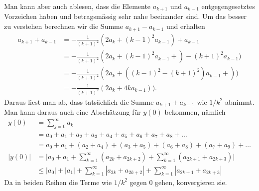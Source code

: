 \begin{loesung}
Man kann aber auch ablesen, dass die Elemente $a_{k+1}$ und $a_{k-1}$ 
entgegengesetztes Vorzeichen haben und betragsmässig sehr nahe beeinander
sind.
Um das besser zu verstehen berechnen wir die Summe $a_{k+1}-a_{k-1}$
und erhalten
\begin{align*}
a_{k+1}+a_{k-1}
&=
-\frac{1}{(k+1)^2}(2a_k + (k-1)^2 a_{k-1}) + a_{k-1}
\\
&=
-\frac{1}{(k+1)^2}(2a_k + (k-1)^2 a_{k-1}+) - (k+1)^2a_{k-1})
\\
&=
-\frac{1}{(k+1)^2}(2a_k + ((k-1)^2-(k+1)^2) a_{k-1}+))
\\
&=
-\frac{1}{(k+1)^2}(2a_k + 4ka_{k-1})).
\end{align*}
Daraus liest man ab, dass tatsächlich die Summe $a_{k+1}+a_{k-1}$
wie $1/k^2$ abnimmt.
Man kann daraus auch eine Abschätzung für $y(0)$ bekommen, nämlich
\begin{align*}
y(0)
&=
\sum_{j=0}^\infty a_k 
\\
&=
a_0 + a_1 + a_2 + a_3 + a_4+ a_5 + a_6 + a_7 + a_8 + \dots
\\
&=
a_0 + a_1 + (a_2 + a_4) + (a_3 + a_5) + (a_6 + a_8) + (a_7 + a_9)+\dots
\\
|y(0)|
&=
\biggl|
a_0 + a_1
+
\sum_{k=1}^\infty (a_{2k} + a_{2k+2})
+
\sum_{k=1}^\infty (a_{2k+1} + a_{2k+3})
\biggr|
\\
&\le
|a_0| + |a_1|
+
\sum_{k=1}^\infty |a_{2k}+a_{2k+2}|
+
\sum_{k=1}^\infty |a_{2k+1}+a_{2k+3}|
\end{align*}
Da in beiden Reihen die Terme wie $1/k^2$ gegen $0$ gehen, konvergieren
sie.
\end{loesung}
